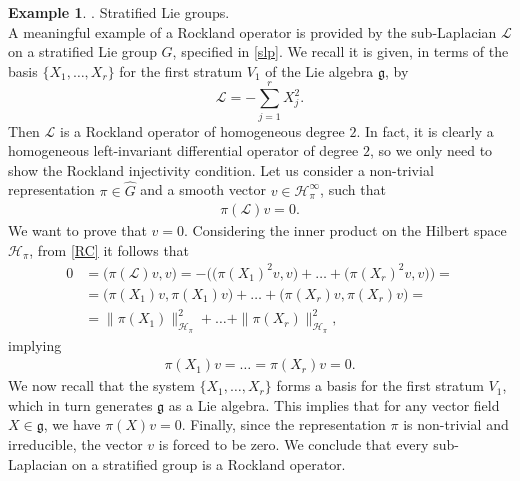 \documentclass[12pt,oneside,a4paper]{book}
\numberwithin{equation}{section}     %
\theoremstyle{plain}
\theoremstyle{definition}
\newtheorem{example}[theorem]{Example}
\newcommand{\slp}{{\mathcal L}}
\begin{document}
\begin{example}\label{exampleRockland}
	. Stratified Lie groups.\\
	\noindent A meaningful example of a Rockland operator is provided by the sub-Laplacian $\slp$ on a stratified Lie group $G$, specified in \eqref{slp}. We recall it is given, in terms of the basis $\{X_1,\dots,X_r\}$ for the first stratum $V_1$ of the Lie algebra $\mathfrak{g}$, by
	\[
	\slp=-\sum_{j=1}^{r}X_j^2.
	\]
	Then $\slp$ is a Rockland operator of homogeneous degree $2$. In fact, it is clearly a homogeneous left-invariant differential operator of degree $2$, so we only need to show the Rockland injectivity condition. Let us consider a non-trivial representation $\pi\in\widehat{G}$ and a smooth vector $v\in\mathcal{H}_\pi^\infty$, such that 
	\begin{align}\label{RC}
	\pi(\slp)v=0.
	\end{align} 
	We want to prove that $v=0$. Considering the inner product on the Hilbert space $\mathcal{H}_\pi$, from \eqref{RC} it follows that 
	\begin{align*}
	0&=\big(\pi(\slp)v,v\big)=-\Big(\big(\pi(X_1)^2v,v\big)+\dots+\big(\pi(X_r)^2v,v\big)\Big)=\\
	&=\big(\pi(X_1)v,\pi(X_1)v\big)+\dots+\big(\pi(X_r)v,\pi(X_r)v\big)=\\
	&=\|\pi(X_1)\|^2_{\mathcal{H}_\pi}+\dots+\|\pi(X_r)\|^2_{\mathcal{H}_\pi},
	\end{align*}
	implying
	\begin{align*}
	\pi(X_1)v=\dots=\pi(X_r)v=0.
	\end{align*}
	We now recall that the system $\{X_1,\dots,X_r\}$ forms a basis for the first stratum $V_1$, which in turn generates $\mathfrak{g}$ as a Lie algebra. This implies that for any vector field $X\in\mathfrak{g}$, we have $\pi(X)v=0$. Finally, since the representation $\pi$ is non-trivial and irreducible, the vector $v$ is forced to be zero. We conclude that every sub-Laplacian on a stratified group is a Rockland operator.
	

\end{example}
\end{document}
